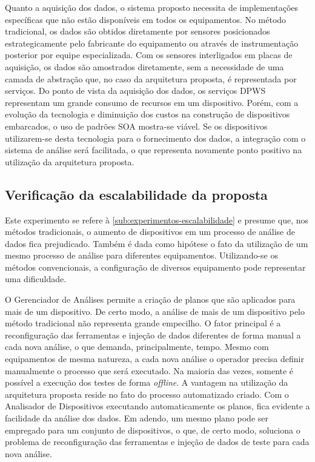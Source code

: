 Quanto a aquisição dos dados, o sistema proposto necessita de implementações específicas que não
estão disponíveis em todos os equipamentos. No método tradicional, os dados são obtidos diretamente
por sensores posicionados estrategicamente pelo fabricante do equipamento ou através de
instrumentação posterior por equipe especializada. Com os sensores interligados em placas de
aquisição, os dados são amostrados diretamente, sem a necessidade de uma camada de abstração que, no
caso da arquitetura proposta, é representada por serviços. Do ponto de vista da aquisição dos dados,
os serviços \gls{DPWS} representam um grande consumo de recursos em um dispositivo. Porém, com a
evolução da tecnologia e diminuição dos custos na construção de dispositivos embarcados, o uso de
padrões \gls{SOA} mostra-se viável. Se os dispositivos utilizarem-se desta tecnologia para o
fornecimento dos dados, a integração com o sistema de análise será facilitada, o que representa
novamente ponto positivo na utilização da arquitetura proposta.


\subsection{Verificação da escalabilidade da proposta}

Este experimento se refere à \cref{sub:experimentos-escalabilidade} e presume que, nos métodos
tradicionais, o aumento de dispositivos em um processo de análise de dados fica prejudicado. Também
é dada como hipótese o fato da utilização de um mesmo processo de análise para diferentes
equipamentos. Utilizando-se os métodos convencionais, a configuração de diversos equipamento pode
representar uma dificuldade.

O Gerenciador de Análises permite a criação de planos que são aplicados para mais de um dispositivo.
De certo modo, a análise de mais de um dispositivo pelo método tradicional não representa grande
empecilho. O fator principal é a reconfiguração das ferramentas e injeção de dados diferentes de
forma manual a cada nova análise, o que demanda, principalmente, tempo. Mesmo com equipamentos de
mesma natureza, a cada nova análise o operador precisa definir manualmente o processo que será
executado. Na maioria das vezes, somente é possível a execução dos testes de forma \textit{offline}.
A vantagem na utilização da arquitetura proposta reside no fato do processo automatizado criado. Com
o Analisador de Dispositivos executando automaticamente os planos, fica evidente a facilidade da
análise dos dados. Em adendo, um mesmo plano pode ser empregado para um conjunto de dispositivos, o
que, de certo modo, soluciona o problema de reconfiguração das ferramentas e injeção de dados de
teste para cada nova análise.
